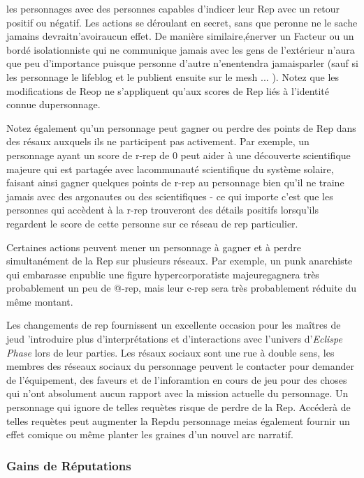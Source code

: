 les personnages avec des personnes capables d'indicer leur Rep avec un retour positif ou négatif. Les actions se déroulant en secret, sans que peronne ne le sache jamains devraitn'avoiraucun effet. De manière similaire,énerver un Facteur ou un bordé isolationniste qui ne communique jamais avec les gens de l'extérieur n'aura que peu d'importance puisque personne d'autre n'enentendra jamaisparler (sauf si les personnage le lifeblog et le publient ensuite sur le mesh ... ). Notez que les modifications de Reop ne s'appliquent qu'aux scores de Rep liés à l'identité connue dupersonnage. 

Notez également qu'un personnage peut gagner ou perdre des points de Rep dans des résaux auxquels ils ne participent pas activement. Par exemple, un personnage ayant un score de r-rep de 0 peut aider à une découverte scientifique majeure qui est partagée avec lacommunauté scientifique du système solaire, faisant ainsi gagner quelques points de r-rep au personnage bien qu'il ne traine jamais avec des argonautes ou des scientifiques - ce qui importe c'est que les personnes qui accèdent à la r-rep trouveront des détails positifs lorsqu'ils regardent le score de cette personne sur ce réseau de rep particulier. 

Certaines actions peuvent mener un personnage à gagner et à perdre simultanément de la Rep sur plusieurs réseaux. Par exemple, un punk anarchiste qui embarasse enpublic une figure hypercorporatiste majeuregagnera très probablement un peu de @-rep, mais leur c-rep sera très probablement réduite du même montant. 

Les changements de rep fournissent un excellente occasion pour les maîtres de jeud 'introduire plus d'interprétations et d'interactions avec l'univers d'\textit{Eclispe Phase} lors de leur parties. Les résaux sociaux sont une rue à double sens, les membres des réseaux sociaux du personnage peuvent le contacter pour demander de l'équipement, des faveurs et de l'inforamtion en cours de jeu pour des choses qui n'ont absolument aucun rapport avec la mission actuelle du personnage. Un personnage qui ignore de telles requètes risque de perdre de la Rep. Accéderà de telles requètes peut augmenter la Repdu personnage meias également fournir un effet comique ou même planter les graines d'un nouvel arc narratif. 

\subsubsection{Gains de Réputations} 

